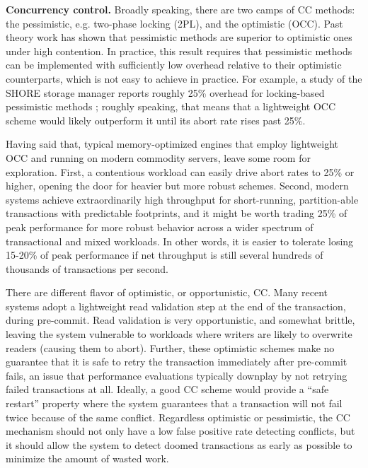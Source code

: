 \vspace{2mm} 
{\bf Concurrency control.} 
Broadly speaking, there are two camps of CC methods: the pessimistic, e.g. two-phase locking (2PL), and the optimistic (OCC). Past theory work \cite{AgrawalCL87} has shown that pessimistic methods are superior to optimistic ones under high contention. In practice, this result requires that pessimistic methods can be implemented with sufficiently low overhead relative to their optimistic counterparts, which is not easy to achieve in practice. For example, a study of the SHORE storage manager reports roughly 25\% overhead for locking-based pessimistic methods \cite{HarizopoulosAMS08}; roughly speaking, that means that a lightweight OCC scheme would likely outperform it until its abort rate rises past 25\%.

Having said that, typical memory-optimized engines that employ lightweight OCC and running on modern commodity servers, leave some room for exploration. First, a contentious workload can easily drive abort rates to 25\% or higher, opening the door for heavier but more robust schemes. Second, modern systems achieve extraordinarily high throughput for short-running, partition-able transactions with predictable footprints, and it might be worth trading 25\% of peak performance for more robust behavior across a wider spectrum of transactional and mixed workloads. In other words, it is easier to tolerate losing 15-20\% of peak performance if net throughput is still several hundreds of thousands of transactions per second.


There are different flavor of optimistic, or opportunistic, CC. Many recent systems adopt a lightweight read validation step at the end of the transaction, during pre-commit. Read validation is very opportunistic, and somewhat brittle, leaving the system vulnerable to workloads where writers are likely to overwrite readers (causing them to abort).
Further, these optimistic schemes make no guarantee that it is safe to retry the transaction immediately after pre-commit fails, an issue that performance evaluations typically downplay by not retrying failed transactions at all. Ideally, a good CC scheme would provide a ``safe restart'' property \cite{PortsG12} where the system guarantees that a transaction will not fail twice because of the same conflict.
Regardless optimistic or pessimistic, the CC mechanism should not only have a low false positive rate detecting conflicts, but it should allow the system to detect doomed transactions as early as possible to minimize the amount of wasted work.

